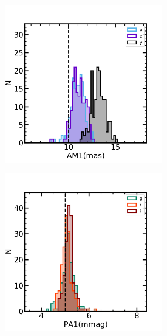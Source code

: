 \begin{figure}[!ht]
\begin{figure}[!htp]
\begin{subfigure}{.5\textwidth}
    \includegraphics[width=0.98\textwidth]{figures/dp02_am1_alltracts_uzy}
\end{subfigure}
\begin{subfigure}{.5\textwidth}
    \includegraphics[width=0.98\textwidth]{figures/dp02_pa1_alltracts_gri}

\end{subfigure}
\end{figure}
\end{figure}
